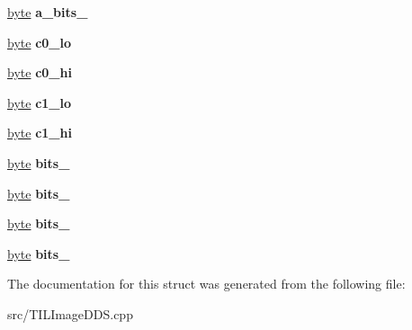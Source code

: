 \begin{DoxyCompactItemize}
\item 
\hypertarget{structtil_1_1_data_d_x_t5_a0305d66d932cea7179deef25f65461f6}{
\hyperlink{namespacetil_a5f3ec10aca1a788b495a0bd3787bc2dc}{byte} {\bfseries a\_\-bits\_}}
\label{structtil_1_1_data_d_x_t5_a0305d66d932cea7179deef25f65461f6}

\item 
\hypertarget{structtil_1_1_data_d_x_t5_afeebca613073efe75dbc212b3c1ca13c}{
\hyperlink{namespacetil_a5f3ec10aca1a788b495a0bd3787bc2dc}{byte} {\bfseries c0\_\-lo}}
\label{structtil_1_1_data_d_x_t5_afeebca613073efe75dbc212b3c1ca13c}

\item 
\hypertarget{structtil_1_1_data_d_x_t5_aa9be775434e5b1e2278380d09aed07a5}{
\hyperlink{namespacetil_a5f3ec10aca1a788b495a0bd3787bc2dc}{byte} {\bfseries c0\_\-hi}}
\label{structtil_1_1_data_d_x_t5_aa9be775434e5b1e2278380d09aed07a5}

\item 
\hypertarget{structtil_1_1_data_d_x_t5_af717640723b85e90c7416b0ecd1b3fb5}{
\hyperlink{namespacetil_a5f3ec10aca1a788b495a0bd3787bc2dc}{byte} {\bfseries c1\_\-lo}}
\label{structtil_1_1_data_d_x_t5_af717640723b85e90c7416b0ecd1b3fb5}

\item 
\hypertarget{structtil_1_1_data_d_x_t5_a9a73363948bd9b81624aec629d163866}{
\hyperlink{namespacetil_a5f3ec10aca1a788b495a0bd3787bc2dc}{byte} {\bfseries c1\_\-hi}}
\label{structtil_1_1_data_d_x_t5_a9a73363948bd9b81624aec629d163866}

\item 
\hypertarget{structtil_1_1_data_d_x_t5_ac9a2c8ae86c220eb732278ac06881957}{
\hyperlink{namespacetil_a5f3ec10aca1a788b495a0bd3787bc2dc}{byte} {\bfseries bits\_}}
\label{structtil_1_1_data_d_x_t5_ac9a2c8ae86c220eb732278ac06881957}

\item 
\hypertarget{structtil_1_1_data_d_x_t5_a26e4a10306aa7eaa576bf3f05368f87b}{
\hyperlink{namespacetil_a5f3ec10aca1a788b495a0bd3787bc2dc}{byte} {\bfseries bits\_}}
\label{structtil_1_1_data_d_x_t5_a26e4a10306aa7eaa576bf3f05368f87b}

\item 
\hypertarget{structtil_1_1_data_d_x_t5_abcde8ea15cb2b7307c6fe85d38408b87}{
\hyperlink{namespacetil_a5f3ec10aca1a788b495a0bd3787bc2dc}{byte} {\bfseries bits\_}}
\label{structtil_1_1_data_d_x_t5_abcde8ea15cb2b7307c6fe85d38408b87}

\item 
\hypertarget{structtil_1_1_data_d_x_t5_a521b7e4301c9c4b09b072db75d024e80}{
\hyperlink{namespacetil_a5f3ec10aca1a788b495a0bd3787bc2dc}{byte} {\bfseries bits\_}}
\label{structtil_1_1_data_d_x_t5_a521b7e4301c9c4b09b072db75d024e80}

\end{DoxyCompactItemize}


The documentation for this struct was generated from the following file:\begin{DoxyCompactItemize}
\item 
src/TILImageDDS.cpp\end{DoxyCompactItemize}
